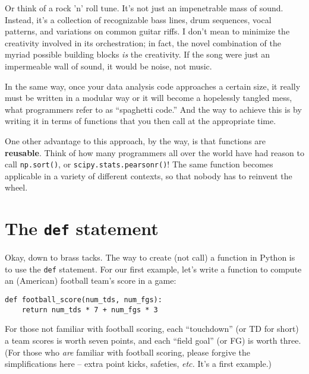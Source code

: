 
Or think of a rock 'n' roll tune. It's not just an impenetrable mass of sound.
Instead, it's a collection of recognizable bass lines, drum sequences, vocal
patterns, and variations on common guitar riffs. I don't mean to minimize the
creativity involved in its orchestration; in fact, the novel combination of the
myriad possible building blocks \textit{is} the creativity. If the song were
just an impermeable wall of sound, it would be noise, not music.



In the same way, once your data analysis code approaches a certain size, it
really must be written in a modular way or it will become a hopelessly tangled
mess, what programmers refer to as ``spaghetti code.'' And the way to achieve
this is by writing it in terms of functions that you then call at the
appropriate time.


One other advantage to this approach, by the way, is that functions are
\textbf{reusable}. Think of how many programmers all over the world
have had reason to call \texttt{np.sort()}, or \texttt{scipy.stats.pearsonr()}!
The same function becomes applicable in a variety of different contexts, so
that nobody has to reinvent the wheel.

\section{The \texttt{def} statement}


Okay, down to brass tacks. The way to create (not call) a function in Python is
to use the \texttt{def} statement. For our first example, let's write a
function to compute an (American) football team's score in a game:


\begin{Verbatim}[fontsize=\small,samepage=true,frame=single,framesep=3mm]
def football_score(num_tds, num_fgs):
    return num_tds * 7 + num_fgs * 3
\end{Verbatim}

For those not familiar with football scoring, each ``touchdown'' (or TD for
short) a team scores is worth seven points, and each ``field goal'' (or FG) is
worth three. (For those who \textit{are} familiar with football scoring, please
forgive the simplifications here -- extra point kicks, safeties, \textit{etc.}
It's a first example.)

